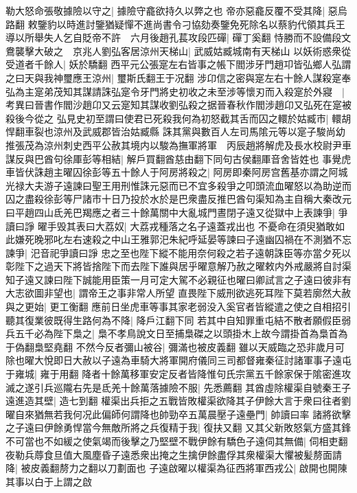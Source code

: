 勒大怒命張敬據險以守之|{
	據險守龕欲持久以弊之也}
帝亦惡龕反覆不受其降|{
	惡烏路翻}
敕鑒豹以時進討鑒猶疑憚不進尚書令刁協劾奏鑒免死除名以蔡豹代領其兵王導以所舉失人乞自貶帝不許　六月後趙孔萇攻段匹磾|{
	磾丁奚翻}
恃勝而不設備段文鴦襲擊大破之　京兆人劉弘客居涼州天梯山|{
	武威姑臧城南有天梯山}
以妖術惑衆從受道者千餘人|{
	妖於驕翻}
西平元公張寔左右皆事之帳下閻涉牙門趙卭皆弘鄉人弘謂之曰天與我神璽應王涼州|{
	璽斯氏翻王于况翻}
涉卬信之密與寔左右十餘人謀殺寔奉弘為主寔弟茂知其謀請誅弘寔令牙門將史初收之未至涉等懷刃而入殺寔於外寢　|{
	考異曰晉書作閻沙趙卬又云寔知其謀收劉弘殺之据晉春秋作閻涉趙卬又弘死在寔被殺後今從之}
弘見史初至謂曰使君已死殺我何為初怒截其舌而囚之轘於姑臧市|{
	轘胡悍翻車裂也涼州及武威郡皆治姑臧縣}
誅其黨與數百人左司馬隂元等以寔子駿尚幼推張茂為涼州刺史西平公赦其境内以駿為撫軍將軍　丙辰趙將解虎及長水校尉尹車謀反與巴酋句徐厙彭等相結|{
	解戶買翻酋慈由翻下同句古侯翻厙音舍皆姓也}
事覺虎車皆伏誅趙主曜囚徐彭等五十餘人于阿房將殺之|{
	阿房即秦阿房宫舊基亦謂之阿城}
光禄大夫游子遠諫曰聖王用刑惟誅元惡而已不宜多殺爭之叩頭流血曜怒以為助逆而囚之盡殺徐彭等尸諸市十日乃投於水於是巴衆盡反推巴酋句渠知為主自稱大秦改元曰平趙四山氐羌巴羯應之者三十餘萬關中大亂城門晝閉子遠又從獄中上表諫爭|{
	爭讀曰諍}
曜手毁其表曰大荔奴|{
	大荔戎種落之名子遠蓋戎出也}
不憂命在須臾猶敢如此嫌死晚邪叱左右速殺之中山王雅郭汜朱紀呼延晏等諫曰子遠幽囚禍在不測猶不忘諫爭|{
	汜音祀爭讀曰諍}
忠之至也陛下縱不能用奈何殺之若子遠朝誅臣等亦當夕死以彰陛下之過天下將皆捨陛下而去陛下誰與居乎曜意解乃赦之曜敕内外戒嚴將自討渠知子遠又諫曰陛下誠能用臣策一月可定大駕不必親征也曜曰卿試言之子遠曰彼非有大志欲圖非望也|{
	謂帝王之事非常人所望}
直畏陛下威刑欲逃死耳陛下莫若廓然大赦與之更始|{
	更工衡翻}
應前日坐虎車等事其家老弱没入奚官者皆縱遣之使之自相招引聽其復業彼既得生路何為不降|{
	降戶江翻下同}
若其中自知罪重屯結不散者願假臣弱兵五千必為陛下梟之|{
	梟不孝鳥說文日至捕梟磔之以頭掛木上故今謂掛首為梟首為于偽翻梟堅堯翻}
不然今反者彌山被谷|{
	彌滿也被皮義翻}
雖以天威臨之恐非歲月可除也曜大悅即日大赦以子遠為車騎大將軍開府儀同三司都督雍秦征討諸軍事子遠屯于雍城|{
	雍于用翻}
降者十餘萬移軍安定反者皆降惟句氏宗黨五千餘家保于隂密進攻滅之遂引兵巡隴右先是氐羌十餘萬落據險不服|{
	先悉薦翻}
其酋虛除權渠自號秦王子遠進造其壁|{
	造七到翻}
權渠出兵拒之五戰皆敗權渠欲降其子伊餘大言于衆曰往者劉曜自來猶無若我何况此偏師何謂降也帥勁卒五萬晨壓子遠壘門|{
	帥讀曰率}
諸將欲擊之子遠曰伊餘勇悍當今無敵所將之兵復精于我|{
	復扶又翻}
又其父新敗怒氣方盛其鋒不可當也不如緩之使氣竭而後擊之乃堅壁不戰伊餘有驕色子遠伺其無備|{
	伺相吏翻}
夜勒兵蓐食旦值大風塵昏子遠悉衆出掩之生擒伊餘盡俘其衆權渠大懼被髪剺面請降|{
	被皮義翻剺力之翻以刀劃面也}
子遠啟曜以權渠為征西將軍西戎公|{
	啟開也開陳其事以白于上謂之啟}
